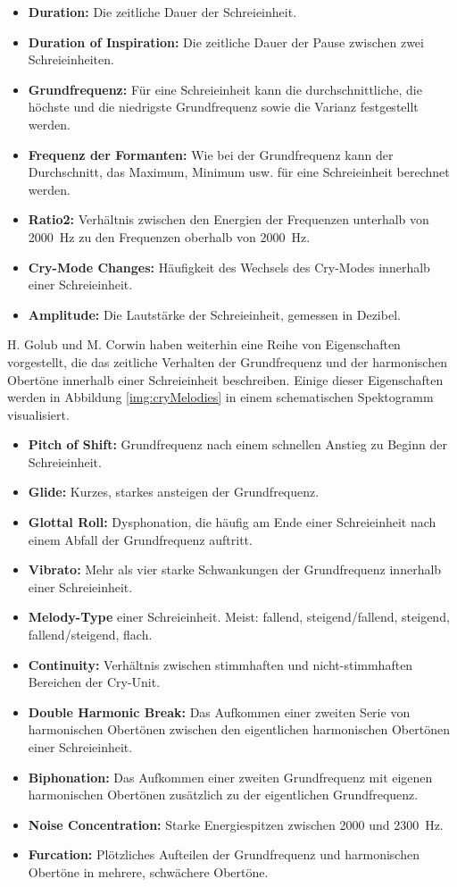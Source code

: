 \begin{itemize}
	\item \textbf{Duration:} Die zeitliche Dauer der Schreieinheit.
	\item \textbf{Duration of Inspiration: }Die zeitliche Dauer der Pause zwischen zwei Schreieinheiten.
	\item \textbf{Grundfrequenz:} Für eine Schreieinheit kann die durchschnittliche, die höchste und die niedrigste Grundfrequenz sowie die Varianz festgestellt werden.
	\item \textbf{Frequenz der Formanten:} Wie bei der Grundfrequenz kann der Durchschnitt, das Maximum, Minimum usw. für eine Schreieinheit berechnet werden.
	\item \textbf{Ratio2: } Verhältnis zwischen den Energien der Frequenzen unterhalb von \SI{2000}{\hertz} zu den Frequenzen oberhalb von \SI{2000}{\hertz}.
	\item \textbf{Cry-Mode Changes:} Häufigkeit des Wechsels des Cry-Modes innerhalb einer Schreieinheit.
	\item \textbf{Amplitude:} Die Lautstärke der Schreieinheit, gemessen in Dezibel.\cite[S. 85]{parentalPerception} \cite[S. 156]{threeCryTypes}
\end{itemize}

H. Golub und M. Corwin haben weiterhin eine Reihe von Eigenschaften vorgestellt, die das zeitliche Verhalten der Grundfrequenz und der harmonischen Obertöne innerhalb einer Schreieinheit beschreiben.\cite[S. 73]{cryModel} Einige dieser Eigenschaften werden in Abbildung \ref{img:cryMelodies} in einem schematischen Spektogramm visualisiert.
\begin{itemize}
	\item \textbf{Pitch of Shift:} Grundfrequenz nach einem schnellen Anstieg zu Beginn der Schreieinheit.
	\item \textbf{Glide:} Kurzes, starkes ansteigen der Grundfrequenz.
	\item  \textbf{Glottal Roll:} Dysphonation, die häufig am Ende einer Schreieinheit nach einem Abfall der Grundfrequenz auftritt.
	\item  \textbf{Vibrato:} Mehr als vier starke Schwankungen der Grundfrequenz innerhalb einer Schreieinheit.
	\item  \textbf{Melody-Type } einer Schreieinheit. Meist: fallend, steigend/fallend, steigend, fallend/steigend, flach. 
	\item  \textbf{Continuity:} Verhältnis zwischen stimmhaften und nicht-stimmhaften Bereichen der Cry-Unit.
	\item  \textbf{Double Harmonic Break:} Das Aufkommen einer zweiten Serie von harmonischen Obertönen zwischen den eigentlichen harmonischen Obertönen einer Schreieinheit.
	\item  \textbf{Biphonation:} Das Aufkommen einer zweiten Grundfrequenz mit eigenen harmonischen Obertönen zusätzlich zu der eigentlichen Grundfrequenz.
	\item  \textbf{Noise Concentration:} Starke Energiespitzen zwischen 2000 und \SI{2300}{\hertz}.
	\item  \textbf{Furcation:} Plötzliches Aufteilen der Grundfrequenz und harmonischen Obertöne in mehrere, schwächere Obertöne.
\end{itemize}

